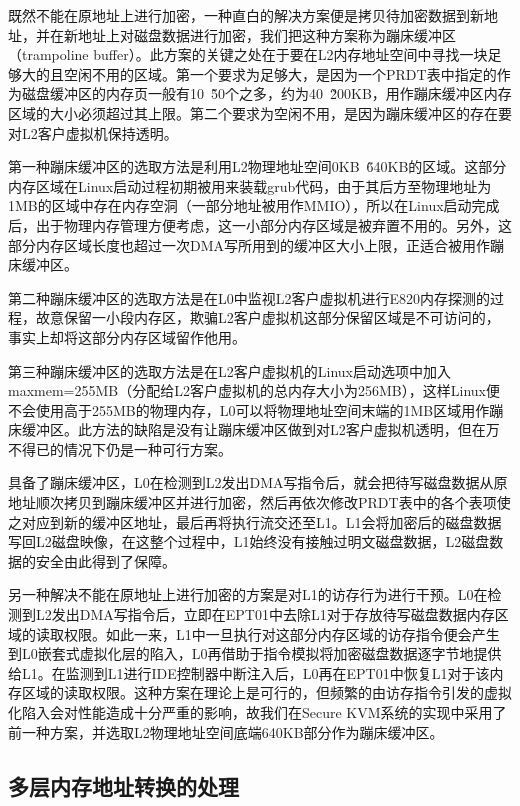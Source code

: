 既然不能在原地址上进行加密，一种直白的解决方案便是拷贝待加密数据到新地址，并在新地址上对磁盘数据进行加密，我们把这种方案称为蹦床缓冲区（trampoline buffer）。此方案的关键之处在于要在L2内存地址空间中寻找一块足够大的且空闲不用的区域。第一个要求为足够大，是因为一个PRDT表中指定的作为磁盘缓冲区的内存页一般有10~\~50个之多，约为40~\~200KB，用作蹦床缓冲区内存区域的大小必须超过其上限。第二个要求为空闲不用，是因为蹦床缓冲区的存在要对L2客户虚拟机保持透明。

第一种蹦床缓冲区的选取方法是利用L2物理地址空间0KB~\~640KB的区域。这部分内存区域在Linux启动过程初期被用来装载grub代码，由于其后方至物理地址为1MB的区域中存在内存空洞（一部分地址被用作MMIO），所以在Linux启动完成后，出于物理内存管理方便考虑，这一小部分内存区域是被弃置不用的。另外，这部分内存区域长度也超过一次DMA写所用到的缓冲区大小上限，正适合被用作蹦床缓冲区。

第二种蹦床缓冲区的选取方法是在L0中监视L2客户虚拟机进行E820内存探测的过程，故意保留一小段内存区，欺骗L2客户虚拟机这部分保留区域是不可访问的，事实上却将这部分内存区域留作他用。

第三种蹦床缓冲区的选取方法是在L2客户虚拟机的Linux启动选项中加入maxmem=255MB（分配给L2客户虚拟机的总内存大小为256MB），这样Linux便不会使用高于255MB的物理内存，L0可以将物理地址空间末端的1MB区域用作蹦床缓冲区。此方法的缺陷是没有让蹦床缓冲区做到对L2客户虚拟机透明，但在万不得已的情况下仍是一种可行方案。

具备了蹦床缓冲区，L0在检测到L2发出DMA写指令后，就会把待写磁盘数据从原地址顺次拷贝到蹦床缓冲区并进行加密，然后再依次修改PRDT表中的各个表项使之对应到新的缓冲区地址，最后再将执行流交还至L1。L1会将加密后的磁盘数据写回L2磁盘映像，在这整个过程中，L1始终没有接触过明文磁盘数据，L2磁盘数据的安全由此得到了保障。

另一种解决不能在原地址上进行加密的方案是对L1的访存行为进行干预。L0在检测到L2发出DMA写指令后，立即在EPT01中去除L1对于存放待写磁盘数据内存区域的读取权限。如此一来，L1中一旦执行对这部分内存区域的访存指令便会产生到L0嵌套式虚拟化层的陷入，L0再借助于指令模拟将加密磁盘数据逐字节地提供给L1。在监测到L1进行IDE控制器中断注入后，L0再在EPT01中恢复L1对于该内存区域的读取权限。这种方案在理论上是可行的，但频繁的由访存指令引发的虚拟化陷入会对性能造成十分严重的影响，故我们在Secure KVM系统的实现中采用了前一种方案，并选取L2物理地址空间底端640KB部分作为蹦床缓冲区。

\subsection{多层内存地址转换的处理}

